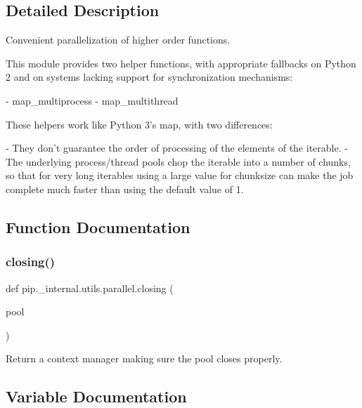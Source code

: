 \subsection{Detailed Description}
\begin{DoxyVerb}Convenient parallelization of higher order functions.

This module provides two helper functions, with appropriate fallbacks on
Python 2 and on systems lacking support for synchronization mechanisms:

- map_multiprocess
- map_multithread

These helpers work like Python 3's map, with two differences:

- They don't guarantee the order of processing of
  the elements of the iterable.
- The underlying process/thread pools chop the iterable into
  a number of chunks, so that for very long iterables using
  a large value for chunksize can make the job complete much faster
  than using the default value of 1.
\end{DoxyVerb}
 

\subsection{Function Documentation}
\mbox{\label{namespacepip_1_1__internal_1_1utils_1_1parallel_a08bb2c13a5c8f31693fffedc06015272}} 
\subsubsection{\texorpdfstring{closing()}{closing()}}
{\footnotesize\ttfamily def pip.\+\_\+internal.\+utils.\+parallel.\+closing (\begin{DoxyParamCaption}\item[{}]{pool }\end{DoxyParamCaption})}

\begin{DoxyVerb}Return a context manager making sure the pool closes properly.\end{DoxyVerb}
 

\subsection{Variable Documentation}
\mbox{\label{namespacepip_1_1__internal_1_1utils_1_1parallel_a58f1f819a3644abf0a89259696e894b5}} 
